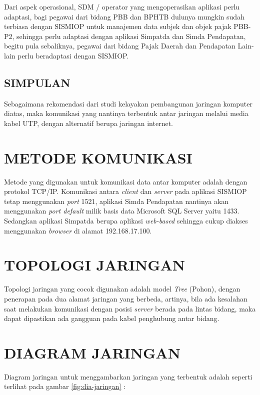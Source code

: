 \documentclass[pdftex,12pt, oneside]{article}
\begin{document}
Dari aspek operasional, SDM / operator yang mengoperasikan aplikasi perlu adaptasi, bagi pegawai dari bidang PBB dan BPHTB dulunya mungkin sudah terbiasa dengan SISMIOP untuk manajemen data subjek dan objek pajak PBB-P2, sehingga perlu adaptasi dengan aplikasi Simpatda dan Simda Pendapatan, begitu pula sebaliknya, pegawai dari bidang Pajak Daerah dan Pendapatan Lain-lain perlu beradaptasi dengan SISMIOP.

\subsection{SIMPULAN}

Sebagaimana rekomendasi dari studi kelayakan pembangunan jaringan komputer diatas, maka komunikasi yang nantinya terbentuk antar jaringan melalui media kabel UTP, dengan alternatif berupa jaringan internet.

\section{METODE KOMUNIKASI}

Metode yang digunakan untuk komunikasi data antar komputer adalah dengan protokol TCP/IP. Komunikasi antara \textit{client} dan \textit{server} pada aplikasi SISMIOP tetap menggunakan \textit{port} 1521, aplikasi Simda Pendapatan nantinya akan menggunakan \textit{port default} milik basis data Microsoft SQL Server yaitu 1433. Sedangkan aplikasi Simpatda berupa aplikasi \textit{web-based} sehingga cukup diakses menggunakan \textit{browser} di alamat 192.168.17.100.

\section{TOPOLOGI JARINGAN}

Topologi jaringan yang cocok digunakan adalah model \textit{Tree} (Pohon), dengan penerapan pada dua alamat jaringan yang berbeda, artinya, bila ada kesalahan saat melakukan komunikasi dengan posisi \textit{server} berada pada lintas bidang, maka dapat dipastikan ada gangguan pada kabel penghubung antar bidang.

\section{DIAGRAM JARINGAN}

Diagram jaringan untuk menggambarkan jaringan yang terbentuk adalah seperti terlihat pada gambar \ref{fig:dia-jaringan} :
\end{document}
